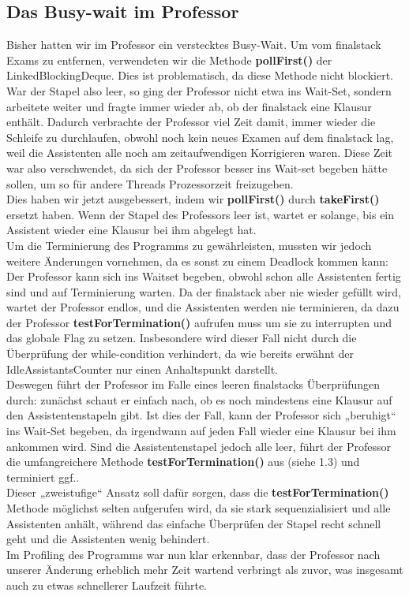 \documentclass[12pt,a4paper]{article}
\begin{document}
\subsection{Das Busy-wait im Professor}

Bisher hatten wir im Professor ein verstecktes Busy-Wait. Um vom finalstack Exams zu entfernen, verwendeten wir die Methode \textbf{pollFirst()} der LinkedBlockingDeque. Dies ist problematisch, da diese Methode nicht blockiert. War der Stapel also leer, so ging der Professor nicht etwa ins Wait-Set, sondern arbeitete weiter und fragte immer wieder ab, ob der finalstack eine Klausur enthält. Dadurch verbrachte der Professor viel Zeit damit, immer wieder die Schleife zu durchlaufen, obwohl noch kein neues Examen auf dem finalstack lag, weil die Assistenten alle noch am zeitaufwendigen Korrigieren waren. Diese Zeit war also verschwendet, da sich der Professor besser ins Wait-set begeben hätte sollen, um so für andere Threads Prozessorzeit freizugeben.\\
Dies haben wir jetzt ausgebessert, indem wir \textbf{pollFirst()} durch \textbf{takeFirst()} ersetzt haben. Wenn der Stapel des Professors leer ist, wartet er solange, bis ein Assistent wieder eine Klausur bei ihm abgelegt hat.\\
Um die Terminierung des Programms zu gewährleisten, mussten wir jedoch weitere Änderungen vornehmen, da es sonst zu einem Deadlock kommen kann: Der Professor kann sich ins Waitset begeben, obwohl schon alle Assistenten fertig sind und auf Terminierung warten. Da der finalstack aber nie wieder gefüllt wird, wartet der Professor endlos, und die Assistenten werden nie terminieren, da dazu der Professor \textbf{testForTermination()} aufrufen muss um sie zu interrupten und das globale Flag zu setzen.  Insbesondere wird dieser Fall nicht durch die Überprüfung der while-condition verhindert, da wie bereits erwähnt der IdleAssistantsCounter nur einen Anhaltspunkt darstellt.\\
Deswegen führt der Professor im Falle eines leeren finalstacks Überprüfungen durch: zunächst schaut er einfach nach, ob es noch mindestens eine Klausur auf den Assistentenstapeln gibt. Ist dies der Fall, kann der Professor sich „beruhigt“ ins Wait-Set begeben, da irgendwann auf jeden Fall wieder eine Klausur bei ihm ankommen wird. Sind die Assistentenstapel jedoch alle leer, führt der Professor die umfangreichere Methode \textbf{testForTermination()} aus (siehe 1.3) und terminiert ggf..\\
Dieser „zweistufige“ Ansatz soll dafür sorgen, dass die \textbf{testForTermination()} Methode möglichst selten aufgerufen wird, da sie stark sequenzialisiert und alle Assistenten anhält, während das einfache Überprüfen der Stapel recht schnell geht und die Assistenten wenig behindert.\\
Im Profiling des Programms war nun klar erkennbar, dass der Professor nach unserer Änderung erheblich mehr Zeit wartend verbringt als zuvor, was insgesamt auch zu etwas schnellerer Laufzeit führte.
\end{document}
